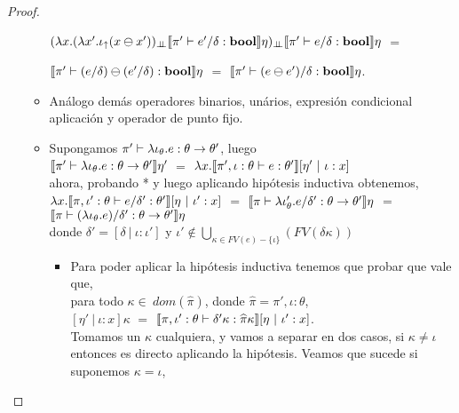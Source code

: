 \begin{proof}
\begin{itemize}
\begin{itemize}
$(\lambda x . 
		(\lambda x' . \iota_{\uparrow} (x \ominus x'))_{\bot \!\!\! \bot}
					\llbracket \pi' \vdash e' / \delta : \textbf{bool} \rrbracket\eta)_{\bot \!\!\! \bot}
						\llbracket \pi' \vdash e / \delta : \textbf{bool} \rrbracket\eta$ $=$
						
$\llbracket \pi' \vdash (e / \delta) \ominus (e' / \delta) : \textbf{bool} \rrbracket\eta$ $=$
$\llbracket \pi' \vdash (e \ominus e') / \delta : \textbf{bool} \rrbracket\eta$.\\

\item An\'alogo dem\'as operadores binarios, un\'arios, expresi\'on condicional
aplicaci\'on y operador de punto fijo.\\

\item Supongamos $\pi' \vdash \lambda \iota_{\theta} . e : \theta \rightarrow \theta'$, luego\\

$\llbracket \pi' \vdash \lambda \iota_{\theta} . e : \theta \rightarrow \theta' \rrbracket\eta'$ $=$
$\lambda x . \llbracket \pi',\iota:\theta \vdash e : \theta' \rrbracket[ \eta' \ | \ \iota:x ]$ \\

ahora, probando * y luego aplicando hip\'otesis inductiva obtenemos,\\

$\lambda x . \llbracket \pi,\iota':\theta \vdash e / \delta' : \theta' \rrbracket[ \eta \ | \ \iota':x ]$ $=$
$\llbracket \pi \vdash \lambda \iota'_{\theta} . e / \delta' : \theta \rightarrow \theta' \rrbracket\eta$ $=$
$\llbracket \pi \vdash (\lambda \iota_{\theta} . e) / \delta' : \theta \rightarrow \theta' \rrbracket\eta$\\

donde $\delta' = [ \delta \ | \ \iota:\iota' ]$ y 
$\iota' \not\in \bigcup\limits_{\kappa \in FV(e)-\{\iota\}} (FV(\delta\kappa))$

\begin{itemize}
\item Para poder aplicar la hip\'otesis inductiva tenemos que probar que vale que,\\

para todo $\kappa \in \ dom (\widehat{\pi})$, donde $\widehat{\pi} = \pi',\iota:\theta$, \\

$[ \eta' \ | \ \iota:x ]\kappa$ $=$ 
$\llbracket \pi,\iota':\theta \vdash \delta'\kappa : \widehat{\pi}\kappa \rrbracket[ \eta \ | \ \iota':x ]$.\\

Tomamos un $\kappa$ cualquiera, y vamos a separar en dos casos, si $\kappa \not= \iota$ entonces
es directo aplicando la hip\'otesis. Veamos que sucede si suponemos $\kappa = \iota$,\\


\end{itemize}
\end{itemize}
\end{itemize}
\end{proof}

